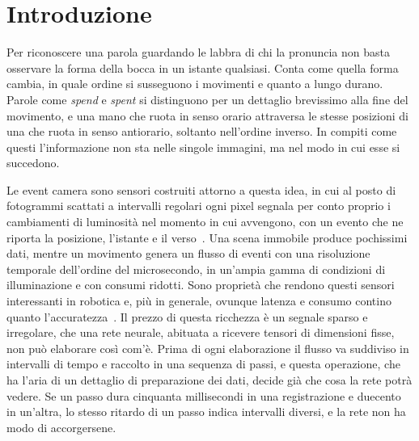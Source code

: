 \chapter*{Introduzione}
\label{chap:introduzione}


Per riconoscere una parola guardando le labbra di chi la pronuncia non basta osservare la forma della bocca in un istante qualsiasi. Conta come quella forma cambia, in quale ordine si susseguono i movimenti e quanto a lungo durano. Parole come \emph{spend} e \emph{spent} si distinguono per un dettaglio brevissimo alla fine del movimento, e una mano che ruota in senso orario attraversa le stesse posizioni di una che ruota in senso antiorario, soltanto nell'ordine inverso. In compiti come questi l'informazione non sta nelle singole immagini, ma nel modo in cui esse si succedono.

Le event camera sono sensori costruiti attorno a questa idea, in cui al posto di fotogrammi scattati a intervalli regolari ogni pixel segnala per conto proprio i cambiamenti di luminosità nel momento in cui avvengono, con un evento che ne riporta la posizione, l'istante e il verso~\cite{lichtsteiner2008dvs}. Una scena immobile produce pochissimi dati, mentre un movimento genera un flusso di eventi con una risoluzione temporale dell'ordine del microsecondo, in un'ampia gamma di condizioni di illuminazione e con consumi ridotti. Sono proprietà che rendono questi sensori interessanti in robotica e, più in generale, ovunque latenza e consumo contino quanto l'accuratezza~\cite{gallego2022event}. Il prezzo di questa ricchezza è un segnale sparso e irregolare, che una rete neurale, abituata a ricevere tensori di dimensioni fisse, non può elaborare così com'è. Prima di ogni elaborazione il flusso va suddiviso in intervalli di tempo e raccolto in una sequenza di passi, e questa operazione, che ha l'aria di un dettaglio di preparazione dei dati, decide già che cosa la rete potrà vedere. Se un passo dura cinquanta millisecondi in una registrazione e duecento in un'altra, lo stesso ritardo di un passo indica intervalli diversi, e la rete non ha modo di accorgersene.

